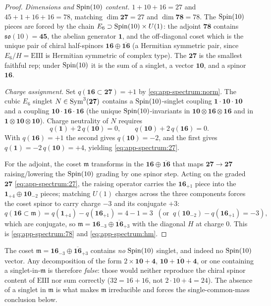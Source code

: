 \begin{proof}
\emph{Dimensions and $\operatorname{Spin}(10)$ content.}
$1+10+16=27$ and $45+1+16+16=78$, matching $\dim\mathbf{27}=27$ and
$\dim\mathbf{78}=78$. The $\operatorname{Spin}(10)$ pieces are forced by the chain
$E_6\supset\operatorname{Spin}(10)\times U(1)$: the adjoint $\mathbf{78}$ contains
$\mathfrak{so}(10)=\mathbf{45}$, the abelian generator $\mathbf{1}$, and
the off-diagonal coset which is the unique pair of chiral half-spinors
$\mathbf{16}\oplus\overline{\mathbf{16}}$ (a Hermitian symmetric pair,
since $E_6/H=\mathrm{EIII}$ is Hermitian symmetric of complex type). The
$\mathbf{27}$ is the smallest faithful rep; under $\operatorname{Spin}(10)$ it is the
sum of a singlet, a vector $\mathbf{10}$, and a spinor $\mathbf{16}$.

\emph{Charge assignment.} Set $q(\mathbf{16}\subset\mathbf{27})=+1$ by
\eqref{eq:app-spectrum:norm}. The cubic $E_6$ singlet
$N\in\operatorname{Sym}^3(\mathbf{27})$ contains a $\operatorname{Spin}(10)$-singlet coupling
$\mathbf{1}\cdot\mathbf{10}\cdot\mathbf{10}$ and a coupling
$\mathbf{10}\cdot\mathbf{16}\cdot\mathbf{16}$ (the unique
$\operatorname{Spin}(10)$-invariants in $\mathbf{10}\otimes\mathbf{16}\otimes\mathbf{16}$
and in $\mathbf{1}\otimes\mathbf{10}\otimes\mathbf{10}$). Charge
neutrality of $N$ requires
\[
  q(\mathbf 1)+2\,q(\mathbf{10})=0,
  \qquad
  q(\mathbf{10})+2\,q(\mathbf{16})=0 .
\]
With $q(\mathbf{16})=+1$ the second gives $q(\mathbf{10})=-2$, and the
first gives $q(\mathbf 1)=-2\,q(\mathbf{10})=+4$, yielding
\eqref{eq:app-spectrum:27}.

For the adjoint, the coset $\mathfrak m$ transforms in the
$\mathbf{16}\oplus\overline{\mathbf{16}}$ that maps
$\mathbf{27}\to\mathbf{27}$ raising/lowering the $\operatorname{Spin}(10)$ grading by
one spinor step. Acting on the graded $\mathbf{27}$
\eqref{eq:app-spectrum:27}, the raising operator carries the
$\mathbf{16}_{+1}$ piece into the $\mathbf{1}_{+4}\oplus\mathbf{10}_{-2}$
pieces; matching $U(1)$ charges across the three components forces the
coset spinor to carry charge $-3$ and its conjugate $+3$:
\[
  q(\mathbf{16}\subset\mathfrak m)
   = q(\mathbf{1}_{+4})-q(\mathbf{16}_{+1}) = 4-1 = 3
   \;\;(\text{or}\;\; q(\mathbf{10}_{-2})-q(\mathbf{16}_{+1})=-3),
\]
which are conjugate, so $\mathfrak m=\mathbf{16}_{-3}\oplus
\overline{\mathbf{16}}_{+3}$ with the diagonal $H$ at charge $0$. This is
\eqref{eq:app-spectrum:78} and \eqref{eq:app-spectrum:hm}.
\end{proof}

\begin{remark}\label{rem:app-spectrum:nosinglet}
The coset $\mathfrak m=\mathbf{16}_{-3}\oplus\overline{\mathbf{16}}_{+3}$
contains \emph{no} $\operatorname{Spin}(10)$ singlet, and indeed no $\operatorname{Spin}(10)$ vector.
Any decomposition of the form $2\times\mathbf{10}+\mathbf 4$,
$\mathbf{10}+\overline{\mathbf{10}}+\mathbf 4$, or one containing a
singlet-in-$\mathfrak m$ is therefore \emph{false}: those would neither
reproduce the chiral spinor content of $\mathrm{EIII}$ nor sum correctly
($32=16+16$, not $2\cdot10+4=24$). The absence of a singlet in
$\mathfrak m$ is what makes $\mathfrak m$ irreducible and forces the
single-common-mass conclusion below.
\end{remark}

